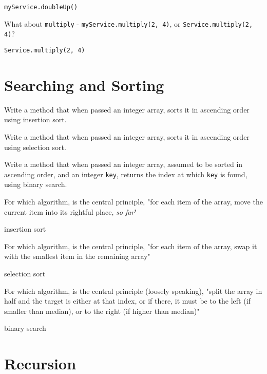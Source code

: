 \documentclass[11pt]{exam}
\begin{document}
\begin{questions}
\begin{solution}
	\texttt{myService.doubleUp()}
\end{solution}


What about \texttt{multiply} - \texttt{myService.multiply(2, 4)}, or \texttt{Service.multiply(2, 4)}?

\begin{solution}
	\texttt{Service.multiply(2, 4)}
\end{solution}

\newpage \section{Searching and Sorting}
\question Write a method that when passed an integer array, sorts it in ascending order using insertion sort.

\question Write a method that when passed an integer array, sorts it in ascending order using selection sort.

\question Write a method that when passed an integer array, assumed to be sorted in ascending order, and an integer \texttt{key}, returns the index at which \texttt{key} is found, using binary search.

\question For which algorithm, is the central principle, "for each item of the array, move the current item into its rightful place, \emph{so far}"

\begin{solution}
	insertion sort
\end{solution}

\question For which algorithm, is the central principle, "for each item of the array, swap it with the smallest item in the remaining array"

\begin{solution}
	selection sort
\end{solution}

\question For which algorithm, is the central principle (loosely speaking), "split the array in half and the target is either at that index, or if there, it must be to the left (if smaller than median), or to the right (if higher than median)"
 
\begin{solution}
	binary search
\end{solution}
 
\newpage \section{Recursion}


\end{questions}
\end{document}
